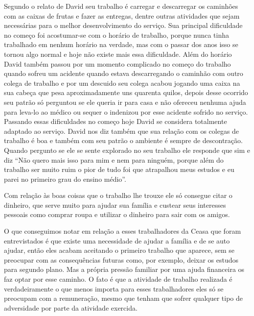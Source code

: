  Segundo o relato de David seu trabalho é carregar e descarregar os caminhões 
com as caixas de frutas e fazer as entregas, dentre outras atividades que sejam 
necessárias para o melhor desenvolvimento do serviço. Sua principal dificuldade 
no começo foi acostumar-se com o horário de trabalho, porque nunca tinha 
trabalhado em nenhum horário na verdade, mas com o passar dos anos isso se 
tornou algo normal e hoje não existe mais essa dificuldade. Além do horário 
David também passou por um momento complicado no começo do trabalho quando 
sofreu um acidente quando estava descarregando o caminhão com outro colega de 
trabalho e por um descuido seu colega acabou jogando uma caixa na sua cabeça que 
pesa aproximadamente uns quarenta quilos, depois desse ocorrido seu patrão só 
perguntou se ele queria ir para casa e não ofereceu nenhuma ajuda para leva-lo 
ao médico ou sequer o indenizou por esse acidente sofrido no serviço. Passando 
essas dificuldades no começo hoje David se considera totalmente adaptado ao 
serviço. David nos diz também que sua relação com os colegas de trabalho é boa 
e também com seu patrão o ambiente é sempre de descontração. Quando pergunto se 
ele se sente explorado no seu trabalho ele responde que sim e diz “Não quero 
mais isso para mim e nem para ninguém, porque além do trabalho ser muito ruim o 
pior de tudo foi que atrapalhou meus estudos e eu parei no primeiro grau do 
ensino médio”. 

 Com relação às boas coisas que o trabalho lhe trouxe ele só consegue citar o 
dinheiro, que serve muito para ajudar sua família e custear seus interesses 
pessoais como comprar roupa e utilizar o dinheiro para sair com os amigos.

 O que conseguimos notar em relação a esses trabalhadores da Ceasa que foram 
entrevistados é que existe uma necessidade de ajudar a família e de se auto 
ajudar, então eles acabam aceitando o primeiro trabalho que aparece, sem se 
preocupar com as consequências futuras como, por exemplo, deixar os estudos para 
segundo plano. Mas a própria pressão familiar por uma ajuda financeira os faz 
optar por esse caminho. O fato é que a atividade de trabalho realizada é 
verdadeiramente o que menos importa para esses trabalhadores eles só se 
preocupam com a remuneração, mesmo que tenham que sofrer qualquer tipo de 
adversidade por parte da atividade exercida.


